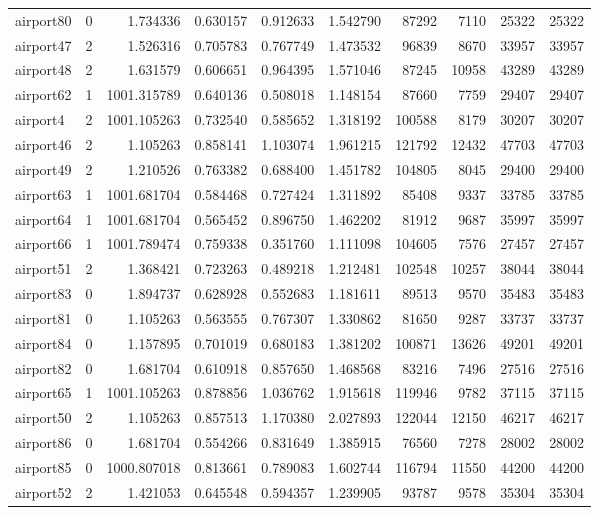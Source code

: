 \begin{longtable}{|l|r|r|r|r|r|r|r|r|r|}
airport80 & 0 & 1.734336 & 0.630157 & 0.912633 & 1.542790 & 87292 & 7110 & 25322 & 25322 \\
airport47 & 2 & 1.526316 & 0.705783 & 0.767749 & 1.473532 & 96839 & 8670 & 33957 & 33957 \\
airport48 & 2 & 1.631579 & 0.606651 & 0.964395 & 1.571046 & 87245 & 10958 & 43289 & 43289 \\
airport62 & 1 & 1001.315789 & 0.640136 & 0.508018 & 1.148154 & 87660 & 7759 & 29407 & 29407 \\
airport4 & 2 & 1001.105263 & 0.732540 & 0.585652 & 1.318192 & 100588 & 8179 & 30207 & 30207 \\
airport46 & 2 & 1.105263 & 0.858141 & 1.103074 & 1.961215 & 121792 & 12432 & 47703 & 47703 \\
airport49 & 2 & 1.210526 & 0.763382 & 0.688400 & 1.451782 & 104805 & 8045 & 29400 & 29400 \\
airport63 & 1 & 1001.681704 & 0.584468 & 0.727424 & 1.311892 & 85408 & 9337 & 33785 & 33785 \\
airport64 & 1 & 1001.681704 & 0.565452 & 0.896750 & 1.462202 & 81912 & 9687 & 35997 & 35997 \\
airport66 & 1 & 1001.789474 & 0.759338 & 0.351760 & 1.111098 & 104605 & 7576 & 27457 & 27457 \\
airport51 & 2 & 1.368421 & 0.723263 & 0.489218 & 1.212481 & 102548 & 10257 & 38044 & 38044 \\
airport83 & 0 & 1.894737 & 0.628928 & 0.552683 & 1.181611 & 89513 & 9570 & 35483 & 35483 \\
airport81 & 0 & 1.105263 & 0.563555 & 0.767307 & 1.330862 & 81650 & 9287 & 33737 & 33737 \\
airport84 & 0 & 1.157895 & 0.701019 & 0.680183 & 1.381202 & 100871 & 13626 & 49201 & 49201 \\
airport82 & 0 & 1.681704 & 0.610918 & 0.857650 & 1.468568 & 83216 & 7496 & 27516 & 27516 \\
airport65 & 1 & 1001.105263 & 0.878856 & 1.036762 & 1.915618 & 119946 & 9782 & 37115 & 37115 \\
airport50 & 2 & 1.105263 & 0.857513 & 1.170380 & 2.027893 & 122044 & 12150 & 46217 & 46217 \\
airport86 & 0 & 1.681704 & 0.554266 & 0.831649 & 1.385915 & 76560 & 7278 & 28002 & 28002 \\
airport85 & 0 & 1000.807018 & 0.813661 & 0.789083 & 1.602744 & 116794 & 11550 & 44200 & 44200 \\
airport52 & 2 & 1.421053 & 0.645548 & 0.594357 & 1.239905 & 93787 & 9578 & 35304 & 35304 \\

\end{longtable}
